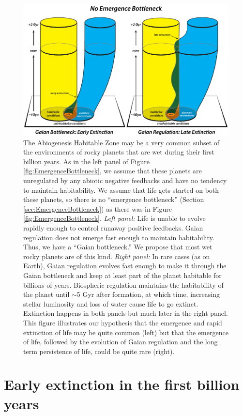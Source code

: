 \begin{figure}[!t]
	\centering
	\includegraphics[width=0.9\linewidth]{figures/GaianRegulation.pdf}
	\caption[Gaian Regulation]{The Abiogenesis Habitable Zone may be a very common subset of the environments of rocky planets that are wet during their first billion years.
		As in the left panel of Figure \ref{fig:EmergenceBottleneck}, we assume that these planets are unregulated by any abiotic negative feedbacks and have no tendency to maintain habitability.
		We assume that life gets started on both these planets, so there is no ``emergence bottleneck'' (Section \ref{sec:EmergenceBottleneck}) as there was in
		Figure \ref{fig:EmergenceBottleneck}.
		\textit{Left panel:} Life is unable to evolve rapidly enough to control runaway positive feedbacks.
		Gaian regulation does not emerge fast enough to maintain habitability. 
		Thus, we have a ``Gaian bottleneck.'' We propose that most wet rocky planets are of this kind.
		\textit{Right panel:} In rare cases (as on Earth), Gaian regulation evolves fast enough to make it through the Gaian bottleneck and
		keep at least part of the planet habitable for billions of years. 
		Biospheric regulation maintains the habitability of the planet until $\sim$5 Gyr after formation, at which time, increasing stellar luminosity and loss of water
		cause life to go extinct.
		Extinction happens in both panels but much later in the right panel.
		This figure illustrates our hypothesis that the emergence and rapid extinction of life may be quite common (left) but that the emergence of life, followed by the evolution of Gaian regulation and the long term persistence of life, could be quite rare (right).}
	\label{fig:GaianBottleneck}
\end{figure}

\section{Early extinction in the first billion years}
